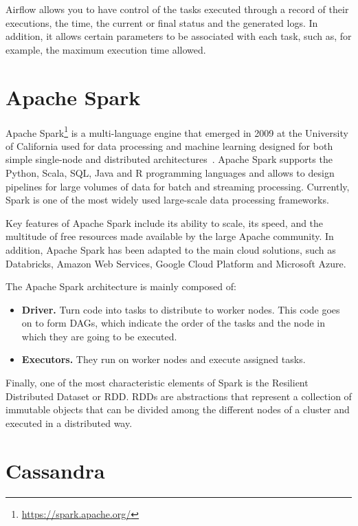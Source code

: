 \nonzeroparskip Airflow allows you to have control of the tasks executed through a record of their executions, the time, the current or final status and the generated logs. In addition, it allows certain parameters to be associated with each task, such as, for example, the maximum execution time allowed.

\section{Apache Spark}

\nonzeroparskip Apache Spark\footnote{\url{https://spark.apache.org/}} is a multi-language engine that emerged in 2009 at the University of California used for data processing and machine learning designed for both simple single-node and distributed architectures~\cite{infoworld_spark}. Apache Spark supports the Python, Scala, SQL, Java and R programming languages and allows to design pipelines for large volumes of data for batch and streaming processing. Currently, Spark is one of the most widely used large-scale data processing frameworks.

\nonzeroparskip Key features of Apache Spark include its ability to scale, its speed, and the multitude of free resources made available by the large Apache community. In addition, Apache Spark has been adapted to the main cloud solutions, such as Databricks, Amazon Web Services, Google Cloud Platform and Microsoft Azure.

\nonzeroparskip The Apache Spark architecture is mainly composed of:
\begin{itemize}
	\item \textbf{Driver.} Turn code into tasks to distribute to worker nodes. This code goes on to form DAGs, which indicate the order of the tasks and the node in which they are going to be executed.
	\item \textbf{Executors.} They run on worker nodes and execute assigned tasks.
\end{itemize}

\nonzeroparskip Finally, one of the most characteristic elements of Spark is the Resilient Distributed Dataset or RDD. RDDs are abstractions that represent a collection of immutable objects that can be divided among the different nodes of a cluster and executed in a distributed way.

\section{Cassandra}

